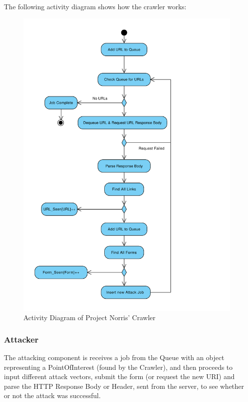 \documentclass[12pt,a4paper]{article}
\begin{document}
The following activity diagram shows how the crawler works:

\begin{figure}[!ht]
    \begin{center}
        \includegraphics[scale=0.7]{images/crawler_activity_diagram.pdf}    
    \end{center}
    \caption{Activity Diagram of Project Norris' Crawler}
    \label{fig:crawler}
\end{figure}

\subsubsection{Attacker}
The attacking component is receives a job from the Queue with an object representing a PointOfInterest (found by the Crawler), and then proceeds to input different attack vectors, submit the form (or request the new URI) and parse the HTTP Response Body or Header, sent from the server, to see whether or not the attack was successful.
\end{document}

